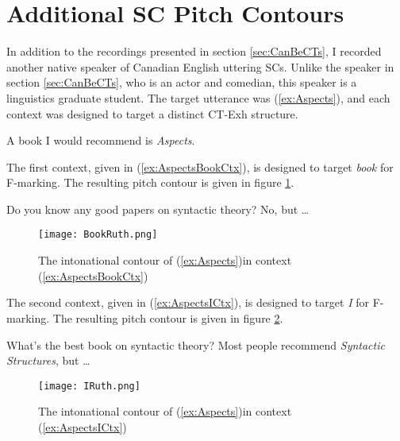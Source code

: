 \documentclass[
	letterpaper,
]{article}
\begin{document}
\appendix
\section{Additional SC Pitch Contours}\label{sec:append}
In addition to the recordings presented in section \ref{sec:CanBeCTs}, I recorded another native speaker of Canadian English uttering SCs.
Unlike the speaker in section \ref{sec:CanBeCTs}, who is an actor and comedian, this speaker is a linguistics graduate student.
The target utterance was (\ref{ex:Aspects}), and each context was designed to target a distinct CT-Exh structure.
\begin{exe}
	\ex\label{ex:Aspects} A book I would recommend is \textit{Aspects}.
\end{exe}

The first context, given in (\ref{ex:AspectsBookCtx}), is designed to target \textit{book} for F-marking.
The resulting pitch contour is given in figure \ref{fig:BookRuth}.
\begin{exe}
\ex \label{ex:AspectsBookCtx}
	\begin{xlist}
		 Do you know any good papers on syntactic theory?
		 No, but \dots
	\end{xlist}	
\end{exe}

\begin{figure}[h]
	\centering
	\texttt{[image: BookRuth.png]}
	\caption{The intonational contour of (\ref{ex:Aspects})in context (\ref{ex:AspectsBookCtx})}
	\label{fig:BookRuth}
\end{figure}
\FloatBarrier

The second context, given in (\ref{ex:AspectsICtx}), is designed to target \textit{I} for F-marking.
The resulting pitch contour is given in figure \ref{fig:IRuth}.
\begin{exe}
\ex\label{ex:AspectsICtx}
\begin{xlist}
	 What’s the best book on syntactic theory?
	 Most people recommend \textit{Syntactic Structures}, but \dots
\end{xlist}	
\end{exe}

\begin{figure}[h]
	\centering
	\texttt{[image: IRuth.png]}
	\caption{The intonational contour of (\ref{ex:Aspects})in context (\ref{ex:AspectsICtx})}
	\label{fig:IRuth}
\end{figure}
\FloatBarrier
\end{document}

